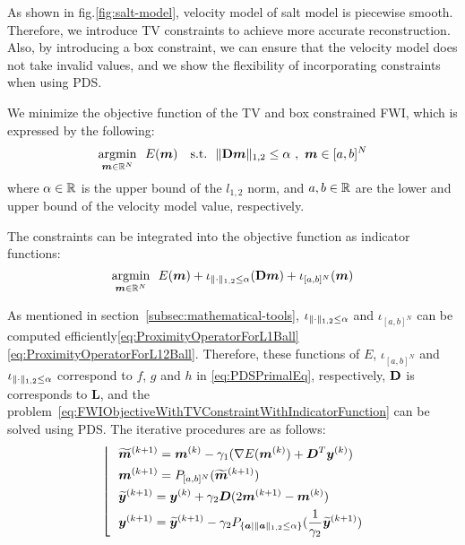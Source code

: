 As shown in fig.\ref{fig:salt-model}, velocity model of salt model is piecewise smooth.
Therefore, we introduce TV constraints to achieve more accurate reconstruction.
Also, by introducing a box constraint, we can ensure that the velocity model does not take invalid values, and we show the flexibility of incorporating constraints when using PDS.

We minimize the objective function of the TV and box constrained FWI, which is expressed by the following:
\begin{equation} \label{eq:FWIObjectiveWithTVConstraint} \argmin{\velModel \in \realNumber^N} \ \ \FWIObjectiveWithTVConstraint \end{equation}
where $\alpha \in \mathbb{R}$ is the upper bound of the $l_{1,2}$ norm, and $a, b \in \mathbb{R}$ are the lower and upper bound of the velocity model value, respectively.

The constraints can be integrated into the objective function as indicator functions:
\begin{equation} \label{eq:FWIObjectiveWithTVConstraintWithIndicatorFunction} \argmin{\velModel \in \realNumber^N} \ \ \FWIObjectiveWithTVConstraintWithIndicatorFunction \end{equation}

As mentioned in section~\ref{subsec:mathematical-tools}, $\iota_{\lVert \cdot \rVert _{1,2} \le \alpha}$ and $\iota_{[a,b]^N}$ can be computed efficiently\eqref{eq:ProximityOperatorForL1Ball}\eqref{eq:ProximityOperatorForL12Ball}.
Therefore, these functions of $E$, $\iota_{[a,b]^N}$ and $\iota_{\lVert \cdot \rVert _{1,2} \le \alpha}$ correspond to $f$, $g$ and $h$ in \eqref{eq:PDSPrimalEq}, respectively, $\mathbf{D}$ is corresponds to $\bm{L}$, and the problem~\eqref{eq:FWIObjectiveWithTVConstraintWithIndicatorFunction} can be solved using PDS.
The iterative procedures are as follows:
\begin{equation} \label{eq:FWIWithPDS} \left \lfloor \ \ \begin{aligned} & \widetilde{\bm{m}}^{(k+1)} = \bm{m}^{(k)} - \gamma_1( \nabla E(\bm{m}^{(k)}) + \bm{D}^T \bm{y}^{(k)} ) \\ & \bm{m}^{(k+1)} = P_{[a,b]^N}(\widetilde{\bm{m}}^{(k+1)}) \\ & \widetilde{\bm{y}}^{(k+1)} = \bm{y}^{(k)} + \gamma_2 \bm{D} (2\bm{m}^{(k+1)} - \bm{m}^{(k)}) \\ & \bm{y}^{(k+1)} = \widetilde{\bm{y}}^{(k+1)} - \gamma_2 P_{ \{ \bm a \mid \lVert  \bm a  \rVert _{1,2} \le \alpha \} }(\frac 1 {\gamma_2} {\widetilde{\bm y}^{(k+1)}}) \end{aligned} \right. \notag \end{equation}

